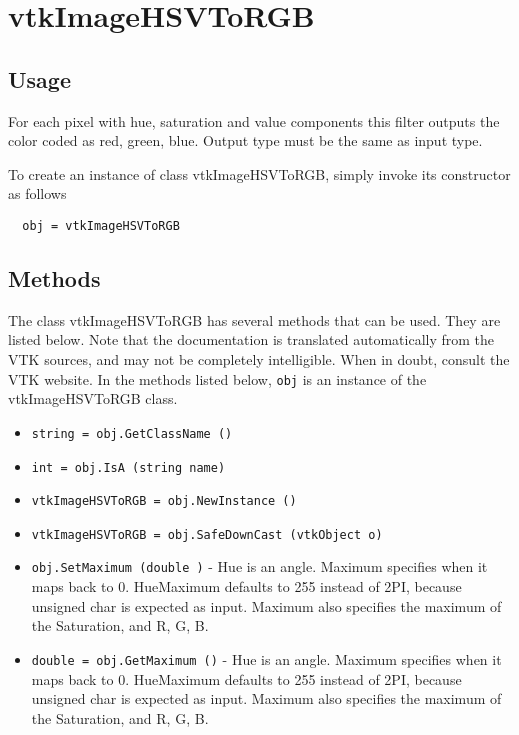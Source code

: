 \section{vtkImageHSVToRGB}

\subsection{Usage}

 For each pixel with hue, saturation and value components this filter
 outputs the color coded as red, green, blue.  Output type must be the same
 as input type.

To create an instance of class vtkImageHSVToRGB, simply
invoke its constructor as follows
\begin{verbatim}
  obj = vtkImageHSVToRGB
\end{verbatim}
\subsection{Methods}

The class vtkImageHSVToRGB has several methods that can be used.
  They are listed below.
Note that the documentation is translated automatically from the VTK sources,
and may not be completely intelligible.  When in doubt, consult the VTK website.
In the methods listed below, \verb|obj| is an instance of the vtkImageHSVToRGB class.
\begin{itemize}
\item  \verb|string = obj.GetClassName ()|

\item  \verb|int = obj.IsA (string name)|

\item  \verb|vtkImageHSVToRGB = obj.NewInstance ()|

\item  \verb|vtkImageHSVToRGB = obj.SafeDownCast (vtkObject o)|

\item  \verb|obj.SetMaximum (double )| -  Hue is an angle. Maximum specifies when it maps back to 0.
 HueMaximum defaults to 255 instead of 2PI, because unsigned char
 is expected as input.
 Maximum also specifies the maximum of the Saturation, and R, G, B.

\item  \verb|double = obj.GetMaximum ()| -  Hue is an angle. Maximum specifies when it maps back to 0.
 HueMaximum defaults to 255 instead of 2PI, because unsigned char
 is expected as input.
 Maximum also specifies the maximum of the Saturation, and R, G, B.

\end{itemize}
